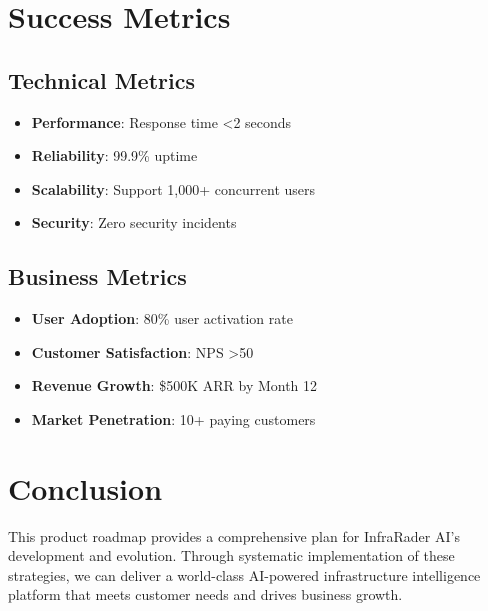 \documentclass[business]{../templates/infraradar-main}
\begin{document}
\section{Success Metrics}

\subsection{Technical Metrics}
\begin{itemize}
    \item \textbf{Performance}: Response time <2 seconds
    \item \textbf{Reliability}: 99.9\% uptime
    \item \textbf{Scalability}: Support 1,000+ concurrent users
    \item \textbf{Security}: Zero security incidents
\end{itemize}

\subsection{Business Metrics}
\begin{itemize}
    \item \textbf{User Adoption}: 80\% user activation rate
    \item \textbf{Customer Satisfaction}: NPS >50
    \item \textbf{Revenue Growth}: \$500K ARR by Month 12
    \item \textbf{Market Penetration}: 10+ paying customers
\end{itemize}

\section{Conclusion}

This product roadmap provides a comprehensive plan for InfraRader AI's development and evolution. Through systematic implementation of these strategies, we can deliver a world-class AI-powered infrastructure intelligence platform that meets customer needs and drives business growth.
\end{document}
